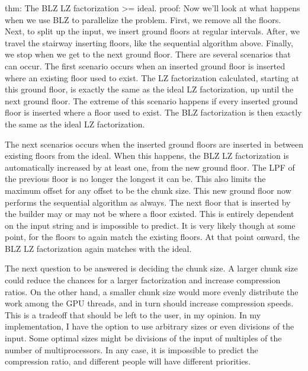 thm: The BLZ LZ factorization >= ideal.
proof:
Now we'll look at what happens when we use BLZ to parallelize the problem.
First, we remove all the floors.
Next, to split up the input, we insert ground floors at regular intervals.
After, we travel the stairway inserting floors, like the sequential algorithm above.
Finally, we stop when we get to the next ground floor.
There are several scenarios that can occur.
The first scenario occurs when an inserted ground floor is inserted where an existing floor used to exist.
The LZ factorization calculated, starting at this ground floor, is exactly the same as the ideal LZ factorization, up until the next ground floor.
The extreme of this scenario happens if every inserted ground floor is inserted where a floor used to exist.
The BLZ factorization is then exactly the same as the ideal LZ factorization.

The next scenarios occurs when the inserted ground floors are inserted in between existing floors from the ideal.
When this happens, the BLZ LZ factorization is automatically increased by at least one, from the new ground floor.
The LPF of the previous floor is no longer the longest it can be.
This also limits the maximum offset for any offset to be the chunk size.
This new ground floor now performs the sequential algorithm as always.
The next floor that is inserted by the builder may or may not be where a floor existed.
This is entirely dependent on the input string and is impossible to predict.
It is very likely though at some point, for the floors to again match the existing floors.
At that point onward, the BLZ LZ factorization again matches with the ideal.

The next question to be answered is deciding the chunk size. 
A larger chunk size could reduce the chances for a larger factorization and increase compression ratios.
On the other hand, a smaller chunk size would more evenly distribute the work among the GPU threads, and in turn should increase compression speeds.
This is a tradeoff that should be left to the user, in my opinion.
In my implementation, I have the option to use arbitrary sizes or even divisions of the input.
Some optimal sizes might be divisions of the input of multiples of the number of multiprocessors.
In any case, it is impossible to predict the compression ratio, and different people will have different priorities.

